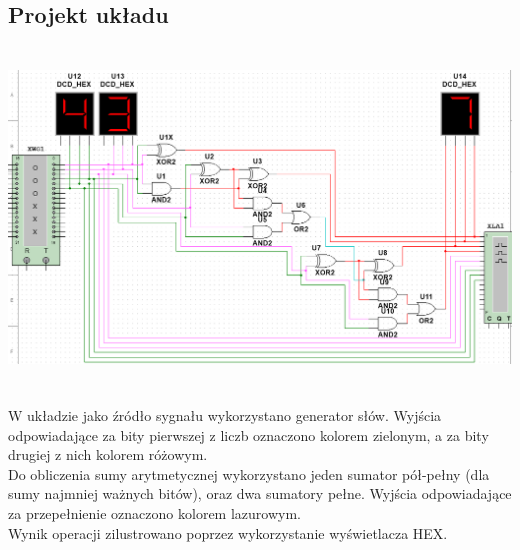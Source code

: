 \documentclass{article}
\begin{document}
        \subsection{Projekt układu}
            \begin{center}
                \includegraphics[height=9cm]{reports/img/Z1A_1.png}\\
            \end{center}
            W układzie jako źródło sygnału wykorzystano generator słów. Wyjścia odpowiadające za bity pierwszej z liczb oznaczono kolorem zielonym, a za bity drugiej z nich kolorem różowym. \\
            Do obliczenia sumy arytmetycznej wykorzystano jeden sumator pół-pełny (dla sumy najmniej ważnych bitów), oraz dwa sumatory pełne. Wyjścia odpowiadające za przepełnienie oznaczono kolorem lazurowym. \\
            Wynik operacji zilustrowano poprzez wykorzystanie wyświetlacza HEX. 
        
\end{document}
